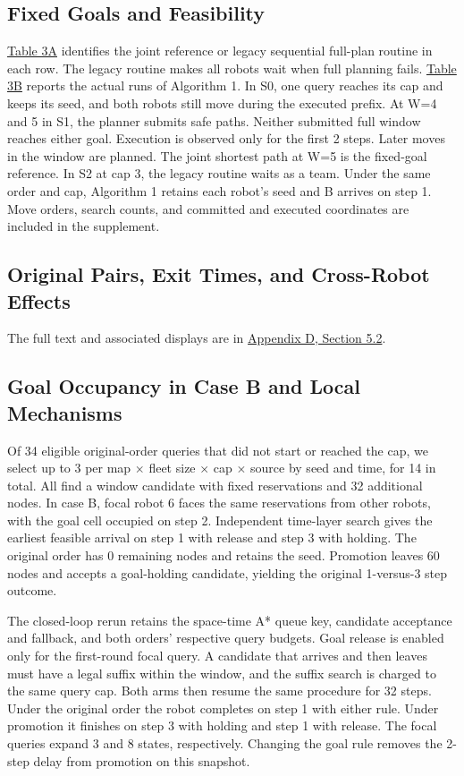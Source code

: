 \documentclass{article}
\begin{document}
\subsection{Fixed Goals and Feasibility}
\hyperlink{display:Table3A}{Table 3A} identifies the joint reference or legacy sequential full-plan routine in each row. The legacy routine makes all robots wait when full planning fails. \hyperlink{display:Table3B}{Table 3B} reports the actual runs of Algorithm 1. In S0, one query reaches its cap and keeps its seed, and both robots still move during the executed prefix. At W=4 and 5 in S1, the planner submits safe paths. Neither submitted full window reaches either goal. Execution is observed only for the first 2 steps. Later moves in the window are planned. The joint shortest path at W=5 is the fixed-goal reference. In S2 at cap 3, the legacy routine waits as a team. Under the same order and cap, Algorithm 1 retains each robot's seed and B arrives on step 1. Move orders, search counts, and committed and executed coordinates are included in the supplement.

\subsection{Original Pairs, Exit Times, and Cross-Robot Effects}
The full text and associated displays are in \hyperlink{sup:5.2}{Appendix D, Section 5.2}.

\subsection{Goal Occupancy in Case B and Local Mechanisms}
Of 34 eligible original-order queries that did not start or reached the cap, we select up to 3 per map \ensuremath{\times} fleet size \ensuremath{\times} cap \ensuremath{\times} source by seed and time, for 14 in total. All find a window candidate with fixed reservations and 32 additional nodes. In case B, focal robot 6 faces the same reservations from other robots, with the goal cell occupied on step 2. Independent time-layer search gives the earliest feasible arrival on step 1 with release and step 3 with holding. The original order has 0 remaining nodes and retains the seed. Promotion leaves 60 nodes and accepts a goal-holding candidate, yielding the original 1-versus-3 step outcome.

The closed-loop rerun retains the space-time A* queue key, candidate acceptance and fallback, and both orders' respective query budgets. Goal release is enabled only for the first-round focal query. A candidate that arrives and then leaves must have a legal suffix within the window, and the suffix search is charged to the same query cap. Both arms then resume the same procedure for 32 steps. Under the original order the robot completes on step 1 with either rule. Under promotion it finishes on step 3 with holding and step 1 with release. The focal queries expand 3 and 8 states, respectively. Changing the goal rule removes the 2-step delay from promotion on this snapshot.
\end{document}
